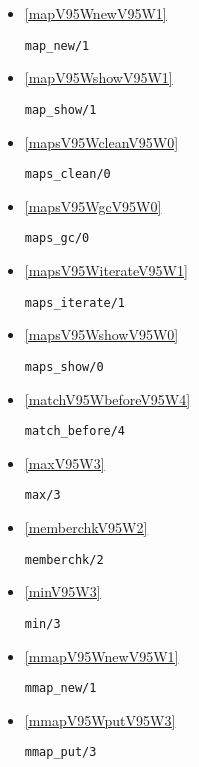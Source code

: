 \begin{itemize}
\item \ref{mapV95WnewV95W1} 
\begin{verbatim}
map_new/1
\end{verbatim}

\item \ref{mapV95WshowV95W1} 
\begin{verbatim}
map_show/1
\end{verbatim}

\item \ref{mapsV95WcleanV95W0} 
\begin{verbatim}
maps_clean/0
\end{verbatim}

\item \ref{mapsV95WgcV95W0} 
\begin{verbatim}
maps_gc/0
\end{verbatim}

\item \ref{mapsV95WiterateV95W1} 
\begin{verbatim}
maps_iterate/1
\end{verbatim}

\item \ref{mapsV95WshowV95W0} 
\begin{verbatim}
maps_show/0
\end{verbatim}

\item \ref{matchV95WbeforeV95W4} 
\begin{verbatim}
match_before/4
\end{verbatim}

\item \ref{maxV95W3} 
\begin{verbatim}
max/3
\end{verbatim}

\item \ref{memberchkV95W2} 
\begin{verbatim}
memberchk/2
\end{verbatim}

\item \ref{minV95W3} 
\begin{verbatim}
min/3
\end{verbatim}

\item \ref{mmapV95WnewV95W1} 
\begin{verbatim}
mmap_new/1
\end{verbatim}

\item \ref{mmapV95WputV95W3} 
\begin{verbatim}
mmap_put/3
\end{verbatim}


\end{itemize}
